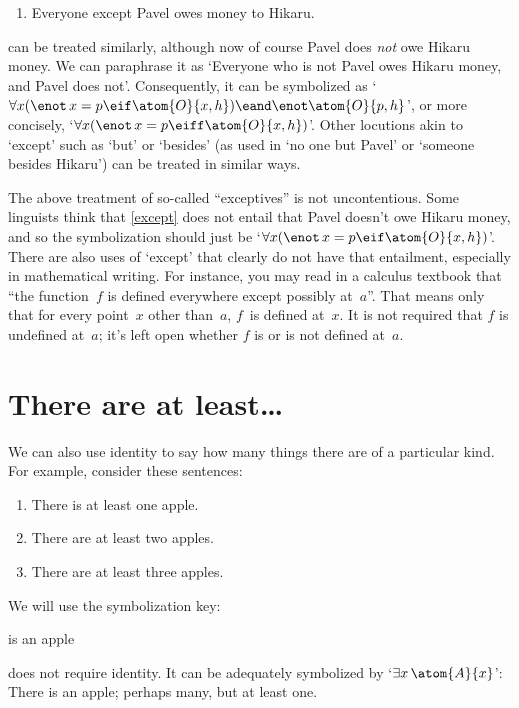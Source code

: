 \begin{enumerate}
	\item\label{except} Everyone except Pavel owes money to Hikaru.
	\end{enumerate}
 can be treated similarly, although now of course Pavel does \emph{not} owe Hikaru money. We can paraphrase it as `Everyone who is not Pavel owes Hikaru money, and Pavel does not'. Consequently, it can be symbolized as `$\forall x(\enot\, {x = p} \eif \atom{O}{x,h}) \eand \enot \atom{O}{p,h}$', or more concisely, `$\forall x(\enot\, {x = p} \eiff \atom{O}{x,h})$'. Other locutions akin to `except' such as `but' or `besides' (as used in `no one but Pavel' or `someone besides Hikaru') can be treated in similar ways.

The above treatment of so-called ``exceptives'' is not uncontentious. Some linguists think that \cref*{except} does not entail that Pavel doesn't owe Hikaru money, and so the symbolization should just be `$\forall x(\enot\, {x = p} \eif \atom{O}{x,h})$'.  There are also uses of `except' that clearly do not have that entailment, especially in mathematical writing.  For instance, you may read in a calculus textbook that ``the function~$f$ is defined everywhere except possibly at~$a$''.  That means only that for every point~$x$ other than~$a$, $f$~is defined at~$x$. It is not required that $f$ is undefined at~$a$; it's left open whether $f$ is or is not defined at~$a$.

\section{There are at least\ldots}
We can also use identity to say how many things there are of a particular kind. For example, consider these sentences:
\begin{enumerate}
\item\label{atleast1} There is at least one apple.
\item\label{atleast2} There are at least two apples.
\item\label{atleast3} There are at least three apples.
\end{enumerate}
We will use the symbolization key:
	\begin{ekey}
		\item[\atom{A}{x}]  is an apple
	\end{ekey}
 does not require identity. It can be adequately symbolized by `$\exists x\, \atom{A}{x}$': There is an apple; perhaps many, but at least one.

